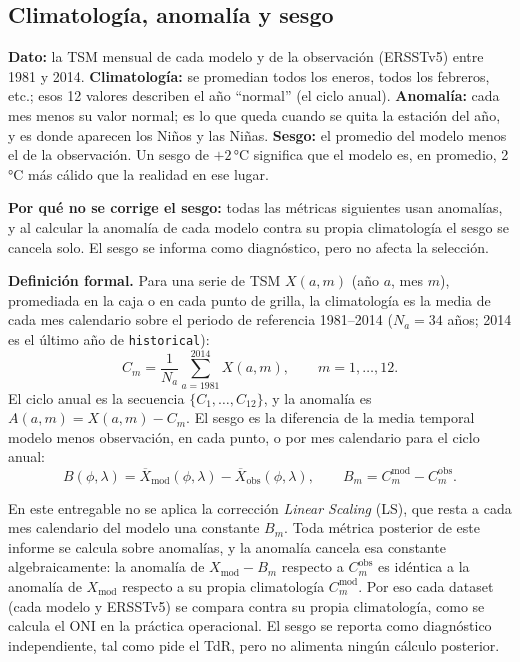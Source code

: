 \documentclass[11pt,a4paper]{article}
\begin{document}
\subsection{Climatología, anomalía y sesgo}
\label{sec:clim}

\begin{basico}
\textbf{Dato:} la TSM mensual de cada modelo y de la observación (ERSSTv5) entre 1981 y 2014. \textbf{Climatología:} se promedian todos los eneros, todos los febreros, etc.; esos 12 valores describen el año ``normal'' (el ciclo anual). \textbf{Anomalía:} cada mes menos su valor normal; es lo que queda cuando se quita la estación del año, y es donde aparecen los Niños y las Niñas. \textbf{Sesgo:} el promedio del modelo menos el de la observación. Un sesgo de $+2$\,°C significa que el modelo es, en promedio, 2\,°C más cálido que la realidad en ese lugar.

\textbf{Por qué no se corrige el sesgo:} todas las métricas siguientes usan anomalías, y al calcular la anomalía de cada modelo contra su propia climatología el sesgo se cancela solo. El sesgo se informa como diagnóstico, pero no afecta la selección.
\end{basico}

\noindent\textbf{Definición formal.} Para una serie de TSM $X(a,m)$ (año $a$, mes $m$), promediada en la caja o en cada punto de grilla, la climatología es la media de cada mes calendario sobre el periodo de referencia 1981--2014 ($N_a = 34$ años; 2014 es el último año de \texttt{historical}):
\begin{equation}
\label{eq:clim}
C_m = \frac{1}{N_a}\sum_{a=1981}^{2014} X(a,m), \qquad m=1,\dots,12 .
\end{equation}
El ciclo anual es la secuencia $\{C_1,\dots,C_{12}\}$, y la anomalía es $A(a,m) = X(a,m) - C_m$. El sesgo es la diferencia de la media temporal modelo menos observación, en cada punto, o por mes calendario para el ciclo anual:
\begin{equation}
\label{eq:sesgo}
B(\phi,\lambda) = \overline{X}_{\mathrm{mod}}(\phi,\lambda) - \overline{X}_{\mathrm{obs}}(\phi,\lambda), \qquad B_m = C_m^{\mathrm{mod}} - C_m^{\mathrm{obs}} .
\end{equation}

En este entregable no se aplica la corrección \emph{Linear Scaling} (LS), que resta a cada mes calendario del modelo una constante $B_m$. Toda métrica posterior de este informe se calcula sobre anomalías, y la anomalía cancela esa constante algebraicamente: la anomalía de $X_{\mathrm{mod}} - B_m$ respecto a $C_m^{\mathrm{obs}}$ es idéntica a la anomalía de $X_{\mathrm{mod}}$ respecto a su propia climatología $C_m^{\mathrm{mod}}$. Por eso cada dataset (cada modelo y ERSSTv5) se compara contra su propia climatología, como se calcula el ONI en la práctica operacional. El sesgo se reporta como diagnóstico independiente, tal como pide el TdR, pero no alimenta ningún cálculo posterior.
\end{document}
